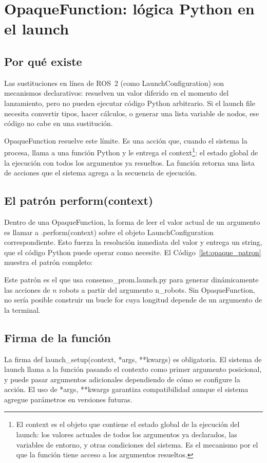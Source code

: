 \section{OpaqueFunction: lógica Python en el launch}

\subsection{Por qué existe}

Las sustituciones en línea de ROS~2 (como LaunchConfiguration) son mecanismos declarativos: resuelven un valor diferido en el momento del lanzamiento, pero no pueden ejecutar código Python arbitrario. Si el launch file necesita convertir tipos, hacer cálculos, o generar una lista variable de nodos, ese código no cabe en una sustitución.

OpaqueFunction resuelve este límite. Es una acción que, cuando el sistema la procesa, llama a una función Python y le entrega el context\footnote{El context es el objeto que contiene el estado global de la ejecución del launch: los valores actuales de todos los argumentos ya declarados, las variables de entorno, y otras condiciones del sistema. Es el mecanismo por el que la función tiene acceso a los argumentos resueltos.}: el estado global de la ejecución con todos los argumentos ya resueltos. La función retorna una lista de acciones que el sistema agrega a la secuencia de ejecución.

\subsection{El patrón perform(context)}

Dentro de una OpaqueFunction, la forma de leer el valor actual de un argumento es llamar a .perform(context) sobre el objeto LaunchConfiguration correspondiente. Esto fuerza la resolución inmediata del valor y entrega un string, que el código Python puede operar como necesite. El Código~\ref{lst:opaque_patron} muestra el patrón completo:



Este patrón es el que usa consenso\_prom.launch.py para generar dinámicamente las acciones de $n$ robots a partir del argumento n\_robots. Sin OpaqueFunction, no sería posible construir un bucle for cuya longitud depende de un argumento de la terminal.

\subsection{Firma de la función}

La firma def launch\_setup(context, *args, **kwargs) es obligatoria. El sistema de launch llama a la función pasando el contexto como primer argumento posicional, y puede pasar argumentos adicionales dependiendo de cómo se configure la acción. El uso de *args, **kwargs garantiza compatibilidad aunque el sistema agregue parámetros en versiones futuras.
